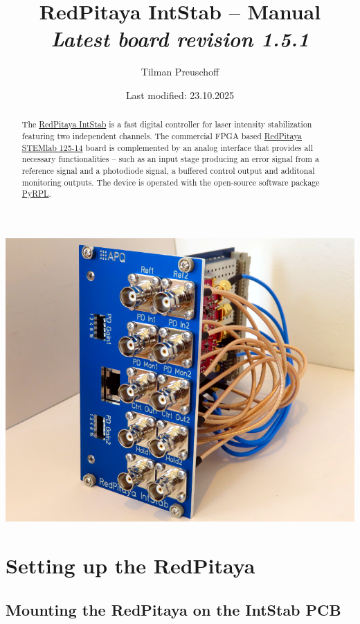 \documentclass[twoside,a4paper]{refart}
\title{RedPitaya IntStab -- Manual\\
	\textit{\normalsize{Latest board revision 1.5.1}}}
\author{Tilman Preuschoff}
\date{Last modified: 23.10.2025}
\begin{document}
\maketitle
\begin{maxipage}
	\includegraphics[width=\textwidth]{fig/intstab.png}
\end{maxipage}
\begin{abstract}
	The \href{https://github.com/TU-Darmstadt-APQ/RedPitaya-IntStab}{RedPitaya IntStab} is a fast digital controller for laser intensity stabilization featuring two independent channels. The commercial FPGA based \href{https://www.redpitaya.com/f130/STEMlab-board}{RedPitaya STEMlab 125-14} board is complemented by an analog interface that provides all necessary functionalities -- such as an input stage producing an error signal from a reference signal and a photodiode signal, a buffered control output and additonal monitoring outputs. The device is operated with the open-source software package \href{https://pyrpl.readthedocs.io/en/latest/}{PyRPL}.  
\end{abstract}
\tableofcontents


\section{Setting up the RedPitaya}

\subsection{Mounting the RedPitaya on the IntStab PCB}
\end{document}
